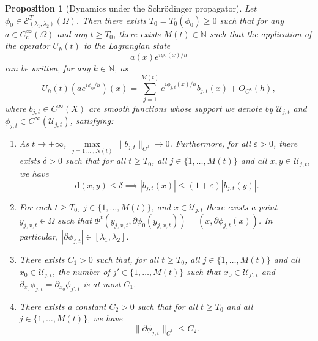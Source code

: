 \documentclass[JEP,XML,SOM,Unicode,published]{cedram}
\let\mathcal\mathscr
\newcommand{\rc}{\mathrm{c}}
\newcommand{\rd}{\,\mathrm{d}}
\theoremstyle{plain}
\newtheorem{proposition}[theorem]{Proposition}
\theoremstyle{definition}
\newcommand{\N}{\mathbb{N}}
\begin{document}
\skpt
\begin{proposition}[Dynamics under the Schrödinger propagator]\label{prop:SumLag3}
Let $\phi_0\in \mathcal{E}^{T}_{(\lambda_1,\lambda_2)}(\Omega)$. Then there exists $T_0=T_0(\phi_0)\geq 0$ such that for any $a\in C_\rc^\infty(\Omega)$ and any $t\geq T_0$, there exists $M(t)\in \N$ such that the application of the operator $U_h(t)$ to the Lagrangian state
\begin{equation*}
a(x) e^{i\phi_0(x)/h}
\end{equation*}
can be written, for any $k\in \N$, as
\begin{equation}\label{eq:PropagLagSum2}
U_h(t) (a e^{i\phi_0/h})(x) = \sum_{j=1}^{M(t)} e^{i\phi_{j,t}(x)/h} b_{j,t}(x) +O_{C^k}(h),
\end{equation}
where $b_{j,t}\in C^\infty(X)$ are smooth functions whose support we denote by $\mathcal{U}_{j,t}$ and $\phi_{j,t}\in C^{\infty}(\mathcal{U}_{j,t})$, satisfying:
\begin{enumerate}
\item As $t\to +\infty$, $\max\limits_{j=1,\dots, N(t)} \|b_{j,t}\|_{C^0}\to 0$. Furthermore, for all $\varepsilon>0$, there exists $\delta>0$ such that for all $t\geq T_0$, all $j\in \{1,\dots, M(t)\}$ and all $x,y\in \mathcal{U}_{j,t}$, we have
\begin{equation}\label{eq:LaBorneLog}
\rd (x,y)\leq \delta \implies |b_{j,t}(x)|\leq (1+\varepsilon) |b_{j,t}(y)|.
\end{equation}
\item For each $t\geq T_0$, $j \in\{1,\dots,M(t)\}$, and $x\in \mathcal{U}_{j,t}$ there exists a point $y_{j,x,t}\in \Omega$ such that $\Phi^t(y_{j,x,t}, \partial \phi_0(y_{j,x,t})) = (x, \partial \phi_{j,t}(x))$. In particular,
$|\partial\phi_{j,t}|\in [\lambda_1,\lambda_2]$.

\item There exists $C_1>0$ such that, for all $t\geq T_0$, all $j\in\{1,\dots,M(t)\}$ and all $x_0\in \mathcal{U}_{j,t}$, the number of $j'\in \{1,\dots,M(t)\}$ such that $x_0\in \mathcal{U}_{j',t}$ and $\partial _{x_0} \phi_{j,t} = \partial _{x_0} \phi_{j',t}$ is at most $C_1$.

\item There exists a constant $C_2>0$ such that for all $t\geq T_0$ and all $j\in\{1,\dots,M(t)\}$, we have
\begin{equation}\label{eq:phase_bound}
\|\partial\phi_{j,t}\|_{C^1}\leq C_2.
\end{equation}
\end{enumerate}
\end{proposition}
\end{document}
